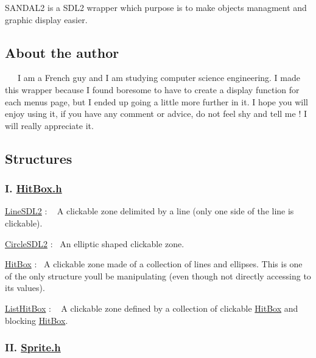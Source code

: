 S\+A\+N\+D\+A\+L2 is a S\+D\+L2 wrapper which purpose is to make objects managment and graphic display easier.

\subsection*{About the author}

~~~I am a French guy and I am studying computer science engineering. I made this wrapper because I found boresome to have to create a display function for each menu\textquotesingle{}s page, but I ended up going a little more further in it. I hope you will enjoy using it, if you have any comment or advice, do not feel shy and tell me ! I will really appreciate it.

\subsection*{Structures}

\subsubsection*{I. \hyperlink{HitBox_8h}{Hit\+Box.\+h}}


\begin{DoxyEnumerate}
\item \hyperlink{structLineSDL2}{Line\+S\+D\+L2} \+: ~\newline
 A clickable zone delimited by a line (only one side of the line is clickable).
\item \hyperlink{structCircleSDL2}{Circle\+S\+D\+L2} \+:~\newline
 An elliptic shaped clickable zone.
\item \hyperlink{structHitBox}{Hit\+Box} \+:~\newline
 A clickable zone made of a collection of lines and ellipses. This is one of the only structure you\textquotesingle{}ll be manipulating (even though not directly accessing to its values).
\item \hyperlink{structListHitBox}{List\+Hit\+Box} \+: ~\newline
 A clickable zone defined by a collection of clickable \hyperlink{structHitBox}{Hit\+Box} and blocking \hyperlink{structHitBox}{Hit\+Box}.
\end{DoxyEnumerate}

\subsubsection*{II. \hyperlink{Sprite_8h}{Sprite.\+h}}



